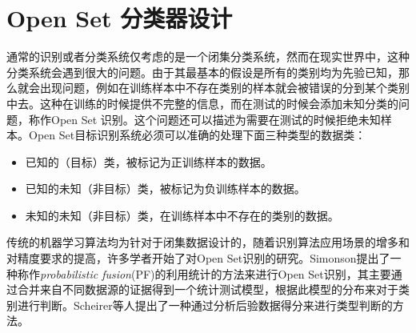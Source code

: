 \section{Open Set 分类器设计}
通常的识别或者分类系统仅考虑的是一个闭集分类系统，然而在现实世界中，这种分类系统会遇到很大的问题。由于其最基本的假设是所有的类别均为先验已知，那么就会出现问题，例如在训练样本中不存在类别的样本就会被错误的分到某个类别中去。这种在训练的时候提供不完整的信息，而在测试的时候会添加未知分类的问题，称作Open Set 识别\cite{scheirer2013toward, jain2014multi}。这个问题还可以描述为需要在测试的时候拒绝未知样本。Open Set目标识别系统必须可以准确的处理下面三种类型的数据类：
\begin{itemize}
	\item 已知的（目标）类，被标记为正训练样本的数据。
	\item 已知的未知（非目标）类，被标记为负训练样本的数据。
	\item 未知的未知（非目标）类，在训练样本中不存在的类别的数据。
\end{itemize}
传统的机器学习算法均为针对于闭集数据设计的，随着识别算法应用场景的增多和对精度要求的提高，许多学者开始了对Open Set识别的研究。Simonson\cite{simonson1998probabilistic}提出了一种称作\textit{probabilistic fusion}(PF)的利用统计的方法来进行Open Set识别，其主要通过合并来自不同数据源的证据得到一个统计测试模型，根据此模型的分布来对于类别进行判断。Scheirer等人\cite{scheirer2011meta}提出了一种通过分析后验数据得分来进行类型判断的方法。

